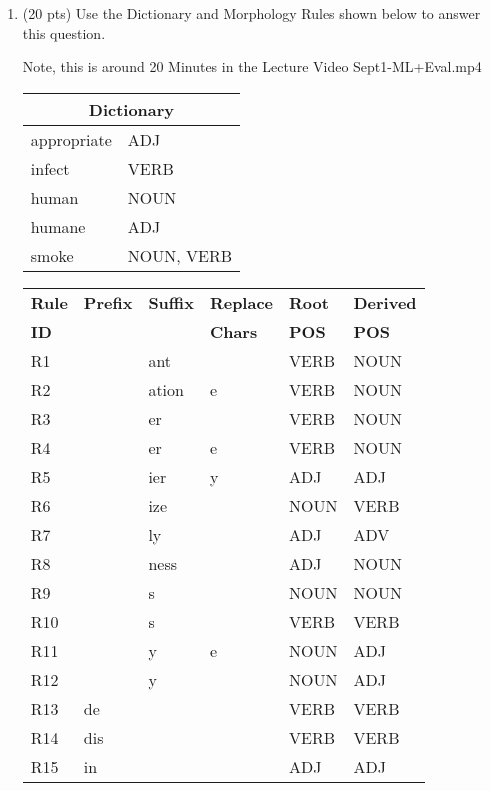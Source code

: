 \documentclass[11pt]{article}
\begin{document}
\begin{enumerate}
\item (20 pts) Use the Dictionary and Morphology Rules shown below to
  answer this question. 

Note, this is around 20 Minutes in the Lecture Video Sept1-ML+Eval.mp4

\begin{center}
\begin{tabular}{|ll|} \hline
\multicolumn{2}{|c|}{\bf Dictionary} \\ \hline
appropriate & ADJ \\
infect & VERB \\
human & NOUN \\
humane & ADJ \\
smoke & NOUN, VERB  \\  \hline
\end{tabular}
\end{center}

\begin{center}
 \small
 \begin{tabular}{|l|l|l|l|l||l|} \hline
\textbf{Rule} & \textbf{Prefix} & \textbf{Suffix} &   \textbf{Replace} &
\textbf{Root} & \textbf{Derived} \\   
\textbf{ID} & ~ & ~ & \textbf{Chars} & \textbf{POS} &  \textbf{POS} \\ \hline
R1 & ~  & ant & ~ & VERB & NOUN \\
R2 & ~  & ation & e & VERB & NOUN \\
R3 & ~  & er & ~ & VERB & NOUN \\
R4 & ~  & er & e & VERB & NOUN \\
R5 & ~  & ier & y & ADJ & ADJ \\
R6 & ~  & ize & ~ & NOUN & VERB \\
R7 & ~  & ly & ~ & ADJ & ADV \\
R8 & ~  & ness & ~ & ADJ & NOUN \\
R9   & ~ & s & ~ & NOUN & NOUN \\
R10   & ~ & s & ~ & VERB & VERB \\
R11 & ~  & y & e & NOUN & ADJ \\
R12 & ~  & y & ~ & NOUN & ADJ \\
R13 & de & ~ & ~ & VERB & VERB \\
R14 & dis & ~ & ~ & VERB & VERB \\
R15 & in  & ~ & ~ & ADJ & ADJ \\ \hline
\end{tabular}
\end{center}


\end{enumerate}
\end{document}
